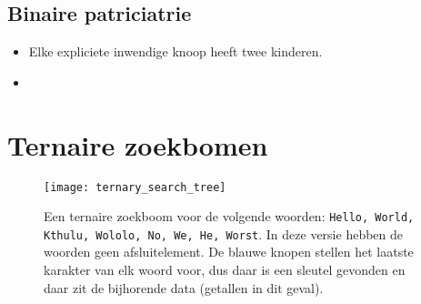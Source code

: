 \subsection{Binaire patriciatrie}
\begin{itemize}
    \item Elke expliciete inwendige knoop heeft twee kinderen.
    \item {}
\end{itemize}


\section{Ternaire zoekbomen}
\begin{figure}[ht]
    \centering
    \texttt{[image: ternary\_search\_tree]}
    \caption{Een ternaire zoekboom voor de volgende woorden: \texttt{Hello, World, Kthulu, Wololo, No, We, He, Worst}. In deze versie hebben de woorden geen afsluitelement. De blauwe knopen stellen het laatste karakter van elk woord voor, dus daar is een sleutel gevonden en daar zit de bijhorende data (getallen in dit geval).}
    \label{fig:ternary_search_tree}
\end{figure}
